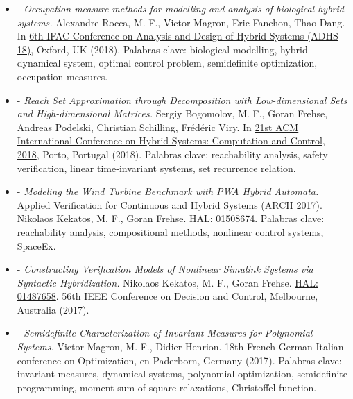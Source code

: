 \documentclass[10pt]{article}
\newenvironment{outerlist}[1][\enskip\textbullet]%
        {\begin{itemize}[#1]}{\end{itemize}%
         \vspace{-.6\baselineskip}}
\begin{document}
\begin{outerlist}

		\item[-] \emph{Occupation measure methods for modelling and analysis of biological hybrid systems.} Alexandre Rocca, M. F., Victor Magron, Eric Fanchon, Thao Dang.
		In \href{https://www.cs.ox.ac.uk/conferences/ADHS18/}{6th IFAC Conference on Analysis and Design of Hybrid Systems (ADHS 18)}, Oxford, UK (2018). Palabras clave: biological modelling, hybrid dynamical system, optimal control problem, semidefinite optimization, occupation measures.

		\item[-] \emph{Reach Set Approximation through Decomposition with Low-dimensional Sets and High-dimensional Matrices.} Sergiy Bogomolov, M. F., Goran Frehse, Andreas Podelski, Christian Schilling, Frédéric Viry.
		In \href{https://www.hscc2018.deib.polimi.it}{21st ACM International Conference on Hybrid Systems: Computation and Control, 2018}, Porto, Portugal (2018). Palabras clave: reachability analysis, safety verification, linear time-invariant systems, set recurrence relation.

		\item[-] \emph{Modeling the Wind Turbine Benchmark with PWA Hybrid Automata.} Applied Verification for Continuous and Hybrid Systems (ARCH 2017). Nikolaos Kekatos, M. F., Goran Frehse.  \href{https://hal.archives-ouvertes.fr/hal-01508674}{HAL: 01508674}. Palabras clave: reachability analysis, compositional methods, nonlinear control systems, SpaceEx. 

		\item[-] \emph{Constructing Verification Models of Nonlinear Simulink Systems via Syntactic Hybridization.} Nikolaos Kekatos, M. F., Goran Frehse.  \href{https://hal.archives-ouvertes.fr/hal-01487658}{HAL: 01487658}. 56th IEEE Conference on Decision and Control, Melbourne, Australia (2017).
		
		\item[-] \emph{Semidefinite Characterization of Invariant Measures for Polynomial Systems.} Victor Magron, M. F., Didier Henrion. 18th French-German-Italian conference on Optimization, en Paderborn, Germany (2017). Palabras clave: invariant measures, dynamical systems, polynomial optimization, semidefinite programming, moment-sum-of-square relaxations, Christoffel function. 

\end{outerlist}
\end{document}
